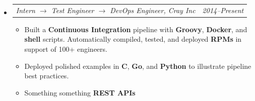 \documentclass[12pt,letterpaper]{article}
\makeatletter
\newcommand{\headerpair}[2]{
    \begin{tabular*}{\linewidth}{l@{ \extracolsep{\fill} }r} {\large\emph{#1}} & {\large\emph{#2}}
    \end{tabular*}
}
\newcommand{\headerrow}[3]{\headerpair{#1, #2}{#3}}
\newcommand{\YearRange}[2]{#1--#2}
\newcommand{\CPP}{C\nolinebreak[4]\hspace{-.05em}\raisebox{.22ex}{\footnotesize\bf ++}\xspace}
\makeatother
\begin{document}
\begin{itemize}[leftmargin=\parindent]
    \parskip=0.1em
    \itemsep=1.2em
    \item[]
        \headerrow
            {Intern $\to$ Test Engineer $\to$ DevOps Engineer}
            {Cray Inc}
            {\YearRange{2014}{Present}}
        \begin{itemize}[leftmargin=\parindent]
            \item Built a \textbf{Continuous Integration} pipeline with \textbf{Groovy}, \textbf{Docker}, and \textbf{shell} scripts. Automatically compiled, tested, and deployed \textbf{RPMs} in support of 100+ engineers.
            \item Deployed polished examples in \textbf{\CPP}, \textbf{Go}, and \textbf{Python} to illustrate pipeline best practices.
            \item Something something \textbf{REST APIs}



\end{itemize}
\end{itemize}
\end{document}
